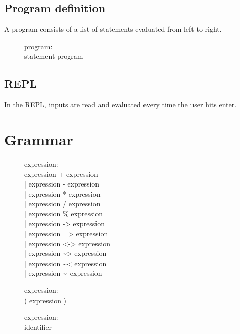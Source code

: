 \subsection{Program definition}
A program consists of a list of statements evaluated from left to right.\\
\begin{description}
  \item[]program: \hfill \\
    statement program
\end{description}

\subsection{REPL}
In the REPL, inputs are read and evaluated every time the user hits enter.\\

\section{Grammar}
\begin{description}
  \item[]expression: \hfill \\
    expression + expression \\
    | expression - expression \\
    | expression * expression \\
    | expression / expression \\
    | expression \% expression \\
    | expression -> expression \\
    | expression => expression \\
    | expression <-> expression \\
    | expression \textasciitilde> expression \\
    | expression \textasciitilde< expression \\
    | expression \textasciitilde~expression \\
\end{description}

\begin{description}
  \item[]expression: \hfill \\
    ( expression )
\end{description}

\begin{description}
  \item[]expression: \hfill \\
    identifier
\end{description}

